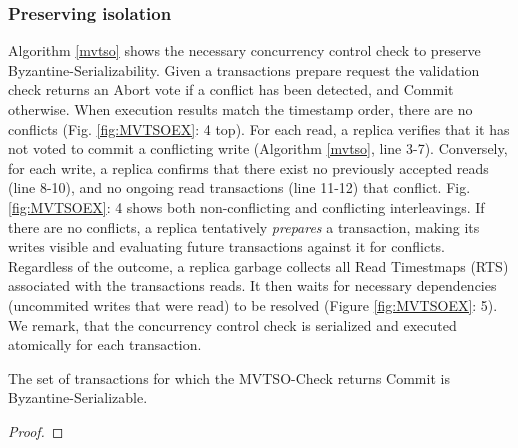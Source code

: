 
\subsubsection{Preserving isolation}

Algorithm \ref{mvtso} shows the necessary concurrency control check to preserve Byzantine-Serializability. 
Given a transactions prepare request the validation check returns an Abort vote if a conflict has been detected, and Commit otherwise. 
When execution results match the timestamp order, there are no conflicts (Fig. \ref{fig:MVTSOEX}: 4 top). For each read, a replica verifies that it has not voted to commit a conflicting write (Algorithm \ref{mvtso}, line 3-7). Conversely, for each write, a replica confirms that there exist no previously accepted reads (line 8-10), and no ongoing read transactions (line 11-12) that conflict. Fig. \ref{fig:MVTSOEX}: 4 shows both non-conflicting and conflicting interleavings.
If there are no conflicts, a replica tentatively \textit{prepares} a transaction, making its writes visible and evaluating future transactions against it for conflicts. Regardless of the outcome, a replica garbage collects all Read Timestmaps (RTS) associated with the transactions reads.
It then waits for necessary dependencies (uncommited writes that were read) to be resolved (Figure \ref{fig:MVTSOEX}: 5). We remark, that the concurrency control check is serialized and executed atomically for each transaction.

\begin{theorem}
The set of transactions for which the MVTSO-Check returns Commit is Byzantine-Serializable. 
\end{theorem}
\begin{proof}
\end{proof}

